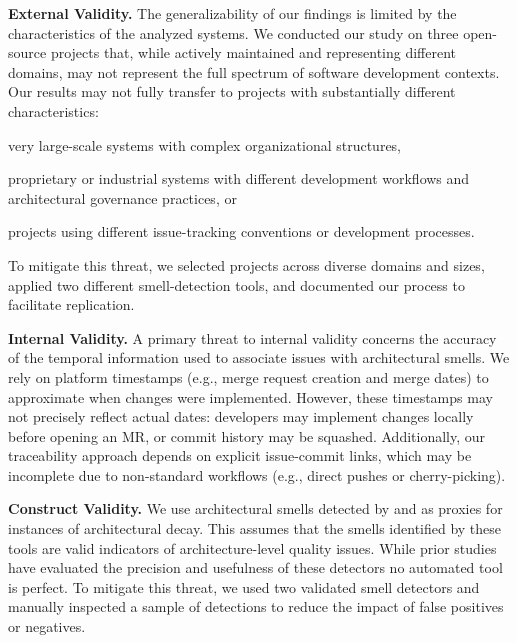 \textbf{External Validity.}
The generalizability of our findings is limited by the characteristics of the analyzed systems.
We conducted our study on three open-source projects that, while actively maintained and representing different domains, may not represent the full spectrum of software development contexts.
Our results may not fully transfer to projects with substantially different characteristics:
\begin{enumerate*}[label=(\roman*)]
    \item very large-scale systems with complex organizational structures,
    \item proprietary or industrial systems with different development workflows and architectural governance practices, or
    \item projects using different issue-tracking conventions or development processes.
\end{enumerate*}
To mitigate this threat, we selected projects across diverse domains and sizes, applied two different smell-detection tools, and documented our process to facilitate replication.


\textbf{Internal Validity.}
A primary threat to internal validity concerns the accuracy of the temporal information used to associate issues with architectural smells.
We rely on platform timestamps (e.g., merge request creation and merge dates) to approximate when changes were implemented.
However, these timestamps may not precisely reflect actual dates: developers may implement changes locally before opening an MR, or commit history may be squashed.
Additionally, our traceability approach depends on explicit issue-commit links, which may be incomplete due to non-standard workflows (e.g., direct pushes or cherry-picking).

\textbf{Construct Validity.}
We use architectural smells detected by \ARCADE and \Arcan as proxies for instances of architectural decay.
This assumes that the smells identified by these tools are valid indicators of architecture-level quality issues. 
While prior studies have evaluated the precision and usefulness of these detectors\cite{sas_2022_evolution,le_2018} no automated tool is perfect.
To mitigate this threat, we used two validated smell detectors and manually inspected a sample of detections to reduce the impact of false positives or negatives.


